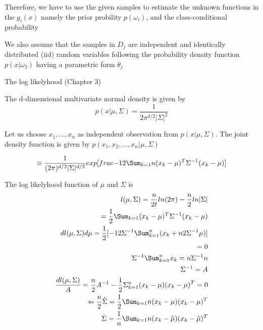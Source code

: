 Therefore, we have to use the given samples to estimate the unknown functions in the $g_i(x)$ namely the prior probility $p(\omega_i)$, and the class-conditional probability  

We also assume that the samples in $D_j$ are independent and identically distributed (iid) random variables following the probability density function $p(x | \omega_2)$ having a parametric form $\theta_j$

The log likelyhood (Chapter 3)


The d-dimensional multivariate normal density is given by 
\begin{equation}
	p(x | \mu , \Sigma) = \frac{1}{2\pi ^{d/2} |\Sigma| ^2}
\end{equation}

Let us choose $x_1, ..., x_n$ as independent observation from $p(x | \mu, \Sigma)$.  The joint density function is given by $p(x_1, x_2, ..., x_n | \mu, \Sigma)$ 

\begin{equation}
	\equiv \frac{1}{(2\pi)^{d/2} |\Sigma|^{d/2}}exp [\\frac{-1}{2} \Sum _{k=1}{n} (x_k - \mu)^T \Sigma^{-1}(x_k - \mu)]
\end{equation}

The log likelyhood function of $\mu$ and $\Sigma$ is 
\begin{eqnarray}
 l (\mu, \Sigma) = \frac{n}{2t} ln (2 \pi) - \frac{n}{2}ln |\Sigma| \\
= \frac{1}{2} \Sum _{k=1} (x_k - \mu)^T \Sigma^{-1}(x_k - \mu) \\
{dl(\mu, \Sigma)} {d\mu} = \frac{1}{2} [ -1 2 \Sigma ^{-1} \Sum _{k=1} ^n (x_k + n 2 \Sigma^{-1} \mu)] \\
= 0 \\
\Sigma^{-1} \Sum_{k=1}^n x_k = n \Sigma^{-1} n\\
\Sigma ^{-1} = A \\
\frac{dl (\mu, \Sigma)}{A} = \frac{n}{2} A^{-1} - \frac{1}{2} \Sigma _{k=1}^n (x_k - \mu)(x_k - \mu)^T = 0 \\
\Leftarrow \frac{n}{2} \hat {\Sigma} = \frac{1}{2} \Sum _{k=1}{n} (x_k - \mu)(x_k - \mu)^T \\
\hat {\Sigma} = \frac{1}{n} \Sum_{k=1}{n} (x_k - \hat{\mu})(x_k - \hat{\mu})^T
\end{eqnarray}


